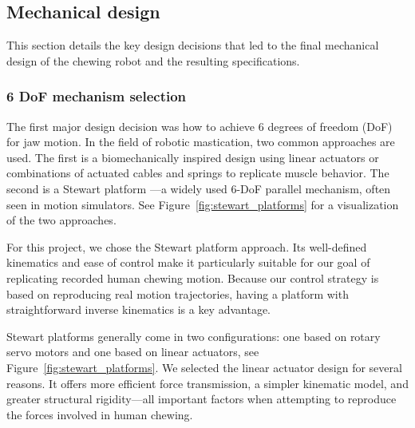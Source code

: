 \subsection{Mechanical design}
\label{sec:mechanical_design}

This section details the key design decisions that led to the final mechanical design of the chewing robot and the resulting specifications.

\subsubsection{6 DoF mechanism selection}

The first major design decision was how to achieve 6 degrees of freedom (DoF) for jaw motion. In the field of robotic mastication, two common approaches 
are used. The first is a biomechanically inspired design using linear actuators \cite{ChewingRobotLinearActuator} or combinations of actuated cables and 
springs \cite{ChewingRobotGums} to replicate muscle behavior. The second is a Stewart platform \cite{BristolChewingRobot}—a widely used 6-DoF parallel mechanism, often seen in 
motion simulators. See Figure~\ref{fig:stewart_platforms} for a visualization of the two approaches.

For this project, we chose the Stewart platform approach. Its well-defined kinematics and ease of control make it particularly suitable for our goal of 
replicating recorded human chewing motion. Because our control strategy is based on reproducing real motion trajectories, having a platform with 
straightforward inverse kinematics is a key advantage.

Stewart platforms generally come in two configurations: one based on rotary servo motors and one based on linear actuators, see Figure~\ref{fig:stewart_platforms}. 
We selected the linear actuator design for several reasons. It offers more efficient force transmission, a simpler kinematic model, and greater structural 
rigidity—all important factors when attempting to reproduce the forces involved in human chewing.

